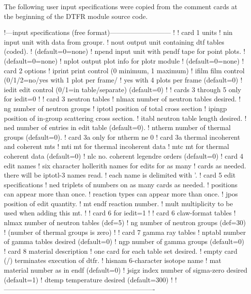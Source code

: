 The following user input specifications were copied from the
comment cards at the beginning of the DTFR module source code.

\small
\begin{ccode}

   !---input specifications (free format)---------------------------
   !
   ! card 1       units
   !    nin       input unit with data from groupr.
   !    nout      output unit containing dtf tables (coded).
   !              (default=0=none)
   !    npend     input unit with pendf tape for point plots.
   !              (default=0=none)
   !    nplot     output plot info for plotr module
   !              (default=0=none)
   ! card 2       options
   !    iprint    print control (0 minimum, 1 maximum)
   !    ifilm     film control (0/1/2=no/yes with 1 plot per frame/
   !              yes with 4 plots per frame (default=0)
   !    iedit     edit control (0/1=in table/separate) (default=0)
   !
   !       cards 3 through 5 only for iedit=0
   !
   ! card 3       neutron tables
   !    nlmax     number of neutron tables desired.
   !    ng        number of neutron groups
   !    iptotl    position of total cross section
   !    ipingp    position of in-group scattering cross section.
   !    itabl     neutron table length desired.
   !    ned       number of entries in edit table (default=0).
   !    ntherm    number of thermal groups (default=0).
   !  card 3a only for ntherm ne 0
   ! card 3a      thermal incoherent and coherent mts
   !    mti       mt for thermal incoherent data
   !    mtc       mt for thermal coherent data (default=0)
   !    nlc       no. coherent legendre orders (default=0)
   ! card 4       edit names
   !       six character hollerith names for edits for as many
   !       cards as needed.  there will be iptotl-3 names read.
   !       each name is delimited with '.
   ! card 5       edit specifications
   !       ned triplets of numbers on as many cards as needed.
   !       positions can appear more than once.
   !       reaction types can appear more than once.
   !    jpos      position of edit quantity.
   !    mt        endf reaction number.
   !    mult      multiplicity to be used when adding this mt.
   !
   !       card 6 for iedit=1
   !
   ! card 6       claw-format tables
   !    nlmax     number of neutron tables (def=5)
   !    ng        number of neutron groups (def=30)
   !              (number of thermal groups is zero)
   !
   ! card 7       gamma ray tables
   !    nptabl    number of gamma tables desired (default=0)
   !    ngp       number of gamma groups (default=0)
   ! card 8       material description
   !       one card for each table set desired.
   !       empty card (/) terminates execution of dtfr.
   !    hisnam    6-character isotope name
   !    mat       material number as in endf (default=0)
   !    jsigz     index number of sigma-zero desired (default=1)
   !    dtemp     temperature desired (default=300)
   !
   !-------------------------------------------------------------------

\end{ccode}
\normalsize

